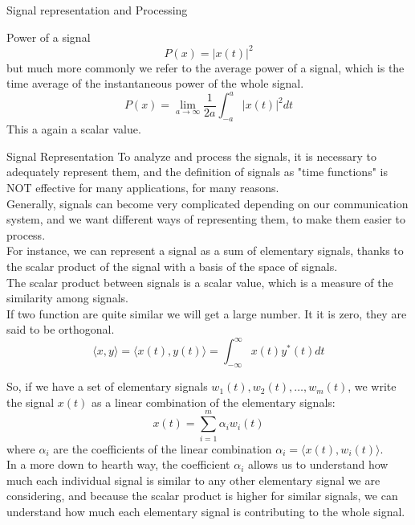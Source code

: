 \begin{section}{Signal representation and Processing}
\begin{subsection}{Power of a signal}
    \begin{equation}
      P(x) = |x(t)|^2
    \end{equation}
    but much more commonly we refer to the average power of a signal, which is the time average of
    the instantaneous power of the whole signal.
    \begin{equation}
      P(x) = \lim_{a \to \infty} \frac{1}{2a} \int_{-a}^{a} |x(t)|^2 dt
    \end{equation}
    This a again a scalar value.
  \end{subsection}
  \begin{subsection}{Signal Representation}
    To analyze and process the signals, it is necessary to adequately represent them, and the
    definition of signals as "time functions" is NOT effective for many applications, for many 
    reasons.\\
    Generally, signals can become very complicated depending on our communication system, and
    we want different ways of representing them, to make them easier to process.\\
    For instance, we can represent a signal as a sum of elementary signals, thanks to the scalar
    product of the signal with a basis of the space of signals.\\

    The scalar product between signals is a scalar value, which is a measure of the similarity 
    among signals.\\
    If two function are quite similar we will get a large number.
    It it is zero, they are said to be orthogonal.
    \begin{equation}
      \langle x,y \rangle = \langle x(t),y(t) \rangle = \int_{-\infty}^{\infty} x(t)y^*(t) dt
    \end{equation}

    So, if we have a set of elementary signals $w_1(t), w_2(t), \dots, w_m(t)$, we write the signal
    $x(t)$ as a linear combination of the elementary signals:
    \begin{equation}
      x(t) = \sum_{i=1}^{m} \alpha_i w_i(t)
    \end{equation}
    where $\alpha_i$ are the coefficients of the linear combination $\alpha_i = \langle x(t), 
    w_i(t) \rangle$.\\
    In a more down to hearth way, the coefficient $\alpha_i$ allows us to understand how much each
    individual signal is similar to any other elementary signal we are considering, and because the 
    scalar product is higher for similar signals, we can understand how much each elementary signal
    is contributing to the whole signal.\\


\end{subsection}
\end{section}
